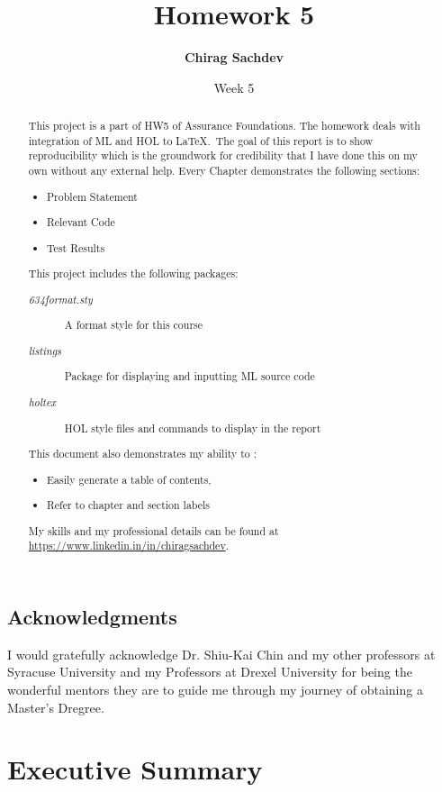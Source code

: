 \documentclass{report}
\title{Homework 5}
\author{\textbf{Chirag Sachdev}}
\date{Week 5}
\begin{document}
\lstset{language=ML}
\maketitle{}

\begin{abstract}
This project is a part of HW5 of Assurance Foundations. The homework deals with integration of ML and HOL to \LaTeX.\ The goal of this report is to show reproducibility which is the groundwork for credibility that I have done this on my own without any external help. Every Chapter demonstrates the following sections:
	\begin{itemize}
		\item Problem Statement
		\item Relevant Code
		\item Test Results
	\end{itemize}
	
This project includes the following packages:
	\begin{description}
		\item[\emph{634format.sty}] A format style for this course
		\item[\emph{listings}] Package for displaying and inputting ML source code
		\item[\emph{holtex}] HOL style files and commands to display in the report
	\end{description}

This document also demonstrates my ability to :
	\begin{itemize}
		\item Easily generate a table of contents,
		\item Refer to chapter and section labels
	\end{itemize}

My skills and my professional details can be found at \url{https://www.linkedin.in/in/chiragsachdev}.
\end{abstract}

\section*{Acknowledgments}
I would gratefully acknowledge Dr. Shiu-Kai Chin and my other professors at Syracuse University and my Professors at Drexel University for being the wonderful mentors they are to guide me through my journey of obtaining a Master's Dregree.

\tableofcontents{}

\chapter{Executive Summary}
\label{cha:executive-summary}
\end{document}
